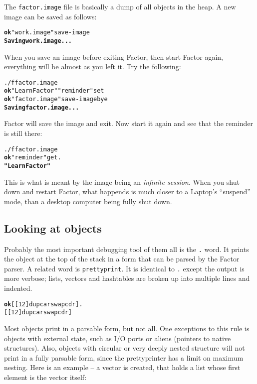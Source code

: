 \documentclass{report}
\newcommand{\tto}{\symbol{123}}
\newcommand{\ttc}{\symbol{125}}
\begin{document}
The \texttt{factor.image} file is basically a dump of all objects in the heap. A new image can be saved as follows:

\begin{alltt}
\textbf{ok} "work.image" save-image
\textbf{Saving work.image...}
\end{alltt}

When you save an image before exiting Factor, then start Factor again, everything will be almost as you left it. Try the following:

\begin{alltt}
./f factor.image
\textbf{ok} "Learn Factor" "reminder" set
\textbf{ok} "factor.image" save-image bye
\textbf{Saving factor.image...}
\end{alltt}

Factor will save the image and exit. Now start it again and see that the reminder is still there:

\begin{alltt}
./f factor.image
\textbf{ok} "reminder" get .
\textbf{"Learn Factor"}
\end{alltt}

This is what is meant by the image being an \emph{infinite session}. When you shut down and restart Factor, what happends is much closer to a Laptop's ``suspend'' mode, than a desktop computer being fully shut down.

\subsection{Looking at objects}

Probably the most important debugging tool of them all is the \texttt{.} word. It prints the object at the top of the stack in a form that can be parsed by the Factor parser. A related word is \texttt{prettyprint}. It is identical to \texttt{.} except the output is more verbose; lists, vectors and hashtables are broken up into multiple lines and indented.

\begin{alltt}
\textbf{ok} [ [ \tto 1 \ttc \tto 2 \ttc ] dup car swap cdr ] .
[ [ \tto 1 \ttc \tto 2 \ttc ] dup car swap cdr ]
\end{alltt}

Most objects print in a parsable form, but not all. One exceptions to this rule is objects with external state, such as I/O ports or aliens (pointers to native structures). Also, objects with circular or very deeply nested structure will not print in a fully parsable form, since the prettyprinter has a limit on maximum nesting. Here is an example -- a vector is created, that holds a list whose first element is the vector itself:
\end{document}
